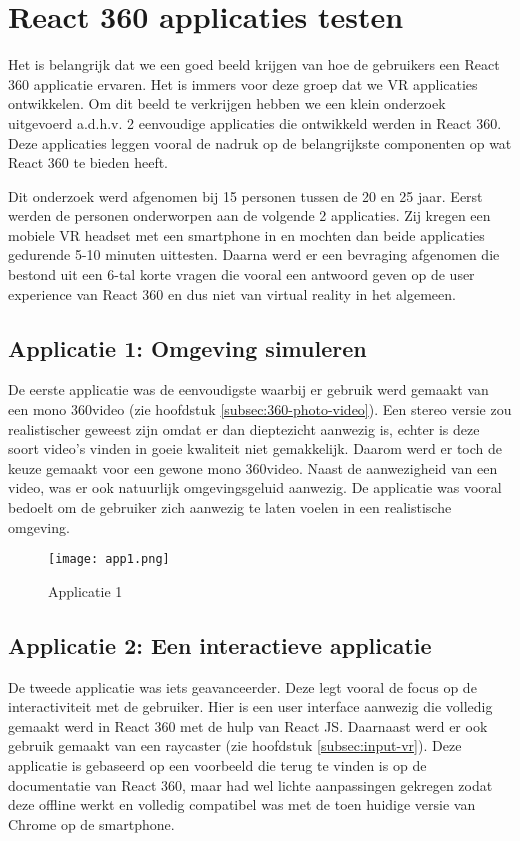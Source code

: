 \chapter{React 360 applicaties testen}
\label{ch:react-360-apps}
Het is belangrijk dat we een goed beeld krijgen van hoe de gebruikers een React 360 applicatie ervaren. Het is immers voor deze groep dat we VR applicaties ontwikkelen. Om dit beeld te verkrijgen hebben we een klein onderzoek uitgevoerd a.d.h.v. 2 eenvoudige applicaties die ontwikkeld werden in React 360. Deze applicaties leggen vooral de nadruk op de belangrijkste componenten op wat React 360 te bieden heeft. 

Dit onderzoek werd afgenomen bij 15 personen tussen de 20 en 25 jaar. Eerst werden de personen onderworpen aan de volgende 2 applicaties. Zij kregen een mobiele VR headset met een smartphone in en mochten dan beide applicaties gedurende 5-10 minuten uittesten. Daarna werd er een bevraging afgenomen die bestond uit een 6-tal korte vragen die vooral een antwoord geven op de user experience van React 360 en dus niet van virtual reality in het algemeen.

\section{Applicatie 1: Omgeving simuleren}
\label{sec:omgeving-simulatie}
De eerste applicatie was de eenvoudigste waarbij er gebruik werd gemaakt van een mono 360\textdegree video (zie hoofdstuk \ref{subsec:360-photo-video}). Een stereo versie zou realistischer geweest zijn omdat er dan dieptezicht aanwezig is, echter is deze soort video's vinden in goeie kwaliteit niet gemakkelijk. Daarom werd er toch de keuze gemaakt voor een gewone mono 360\textdegree video. Naast de aanwezigheid van een video, was er ook natuurlijk omgevingsgeluid aanwezig. De applicatie was vooral bedoelt om de gebruiker zich aanwezig te laten voelen in een realistische omgeving.

\begin{figure}[H]
	\centering
	\texttt{[image: app1.png]}
	\caption{Applicatie 1}
	\label{fig:app1}
\end{figure}

\section{Applicatie 2: Een interactieve applicatie}
\label{sec:interactieve-applicatie}
De tweede applicatie was iets geavanceerder. Deze legt vooral de focus op de interactiviteit met de gebruiker. Hier is een user interface aanwezig die volledig gemaakt werd in React 360 met de hulp van React JS. Daarnaast werd er ook gebruik gemaakt van een raycaster (zie hoofdstuk \ref{subsec:input-vr}). Deze applicatie is gebaseerd op een voorbeeld die terug te vinden is op de documentatie van React 360, maar had wel lichte aanpassingen gekregen zodat deze offline werkt en volledig compatibel was met de toen huidige versie van Chrome op de smartphone.

